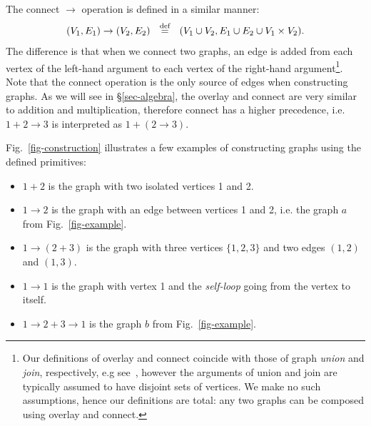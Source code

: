 The connect $\rightarrow$ operation is defined in a similar manner:
\[
(V_1, E_1) \rightarrow (V_2, E_2)~~\stackrel{\text{def}}{=}~~(V_1 \cup V_2, E_1 \cup E_2 \cup V_1 \times V_2).
\]
The difference is that when we connect two graphs, an edge is added from each
vertex of the left-hand argument to each vertex of the right-hand
argument\footnote{Our definitions of overlay and connect coincide
with those of graph \emph{union} and \emph{join}, respectively,
e.g see~\citet{1969_graph_theory_harary},
however the arguments of union and join are typically assumed to have disjoint
sets of vertices. We make no such assumptions, hence our definitions are total:
any two graphs can be composed using overlay and connect.
}.
Note that the connect operation is the only source of edges when constructing
graphs. As we will see in \S\ref{sec-algebra}, the overlay and connect are very
similar to addition and multiplication, therefore connect has a higher
precedence, i.e. $1 + 2 \rightarrow 3$ is interpreted as $1 + (2 \rightarrow 3)$.

\noindent
Fig.~\ref{fig-construction} illustrates a few examples of constructing graphs
using the defined primitives:
\begin{itemize}
  \item $1 + 2$ is the graph with two isolated vertices 1 and 2.
  \item $1 \rightarrow 2$ is the graph with an edge between vertices 1
  and 2, i.e. the graph $a$ from Fig.~\ref{fig-example}.
  \item $1 \rightarrow (2 + 3)$ is the graph with three vertices $\{1, 2, 3\}$
  and two edges $(1, 2)$ and $(1, 3)$.
  \item $1 \rightarrow 1$ is the graph with vertex 1 and the \emph{self-loop}
  going from the vertex to itself.
  \item $1 \rightarrow 2 + 3 \rightarrow 1$ is the graph $b$ from
  Fig.~\ref{fig-example}.
\end{itemize}


